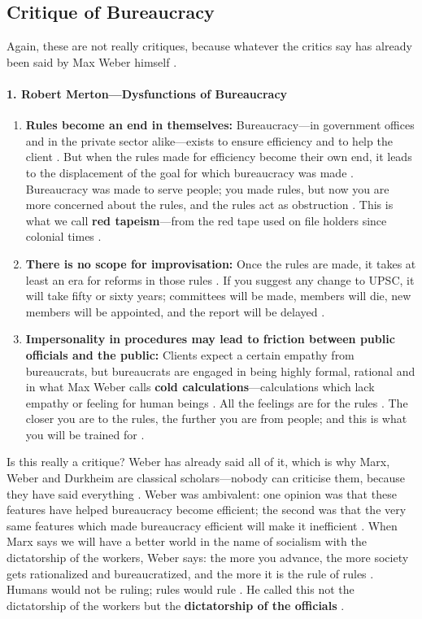 \subsection{Critique of Bureaucracy}
Again, these are not really critiques, because whatever the critics say has already been said by Max Weber himself .

\paragraph{1. Robert Merton---Dysfunctions of Bureaucracy}
\begin{enumerate}
    \item \textbf{Rules become an end in themselves:} Bureaucracy---in government offices and in the private sector alike---exists to ensure efficiency and to help the client . But when the rules made for efficiency become their own end, it leads to the displacement of the goal for which bureaucracy was made . Bureaucracy was made to serve people; you made rules, but now you are more concerned about the rules, and the rules act as obstruction . This is what we call \textbf{red tapeism}---from the red tape used on file holders since colonial times .
    \item \textbf{There is no scope for improvisation:} Once the rules are made, it takes at least an era for reforms in those rules . If you suggest any change to UPSC, it will take fifty or sixty years; committees will be made, members will die, new members will be appointed, and the report will be delayed .
    \item \textbf{Impersonality in procedures may lead to friction between public officials and the public:} Clients expect a certain empathy from bureaucrats, but bureaucrats are engaged in being highly formal, rational and in what Max Weber calls \textbf{cold calculations}---calculations which lack empathy or feeling for human beings . All the feelings are for the rules . The closer you are to the rules, the further you are from people; and this is what you will be trained for .
\end{enumerate}

\begin{CriticalPoint}
Is this really a critique? Weber has already said all of it, which is why Marx, Weber and Durkheim are classical scholars---nobody can criticise them, because they have said everything .
Weber was ambivalent: one opinion was that these features have helped bureaucracy become efficient; the second was that the very same features which made bureaucracy efficient will make it inefficient .
When Marx says we will have a better world in the name of socialism with the dictatorship of the workers, Weber says: the more you advance, the more society gets rationalized and bureaucratized, and the more it is the rule of rules . Humans would not be ruling; rules would rule .
He called this not the dictatorship of the workers but the \textbf{dictatorship of the officials} .
\end{CriticalPoint}

